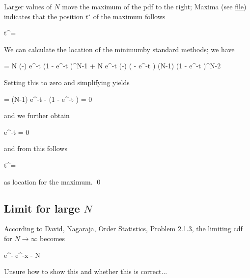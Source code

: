 Larger values of $N$ move the maximum of the pdf to the right; Maxima (see \href{files/2019-09-06-exponential_pdf_3.wxmx}{file}) indicates that the position $t^\star$ of the maximum follows

\bee
t^\star = 
\eee

We can calculate the location of the minimumby standard methods; we have

\bee
{} = \lambda N (-\lambda) e^{-\lambda t} \left(1 - e^{-\lambda t} \right)^{N-1} + \lambda N e^{-\lambda t} (-\lambda) \left( - e^{-\lambda t} \right) (N-1) \left(1 - e^{-\lambda t} \right)^{N-2}
\eee

Setting this to zero and simplifying yields

\bee
{} = (N-1) e^{-\lambda t} - \left(1 - e^{-\lambda t} \right) = 0
\eee

and we further obtain

\bee
e^{-\lambda t}  = 0
\eee

and from this follows

\bee
t^\star = 
\eee

as location for the maximum. \qed

\subsection{Limit for large $N$}

According to David, Nagaraja, Order Statistics, Problem 2.1.3, the limiting cdf for $N \rightarrow \infty$ becomes

\bee
e^{- e^{-x}} - \log N
\eee

Unsure how to show this and whether this is correct...

